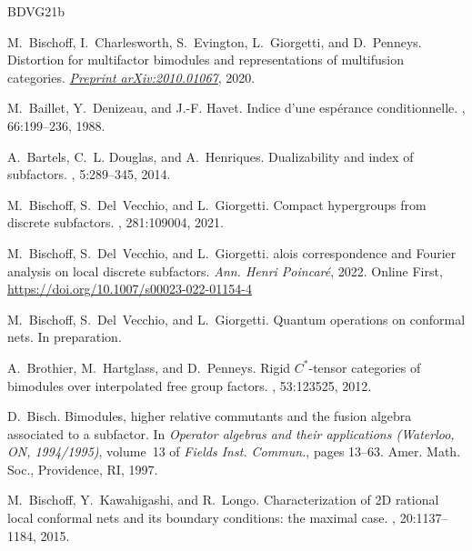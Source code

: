 \documentclass[11pt,a4paper]{article}
\theoremstyle{plain}
\theoremstyle{definition}
\theoremstyle{remark}
\numberwithin{equation}{section}%
\begin{document}
\newcommand{\etalchar}[1]{$^{#1}$}
\def\cprime{$'$}
\begin{thebibliography}{BDVG21b}

\bibitem[BCE{\etalchar{+}}20]{BCEGP20}
M.~Bischoff, I.~Charlesworth, S.~Evington, L.~Giorgetti, and D.~Penneys.
\newblock Distortion for multifactor bimodules and representations of
  multifusion categories.
\newblock \href{https://arxiv.org/abs/2010.01067}{\em Preprint arXiv:2010.01067}, 2020.

M.~Baillet, Y.~Denizeau, and J.-F. Havet.
\newblock Indice d'une esp{\'e}rance conditionnelle.
, 66:199--236, 1988.

A.~Bartels, C.~L. Douglas, and A.~Henriques.
\newblock Dualizability and index of subfactors.
, 5:289--345, 2014.

M.~Bischoff, S.~Del~Vecchio, and L.~Giorgetti.
\newblock Compact hypergroups from discrete subfactors.
, 281:109004, 2021.

M.~Bischoff, S.~Del~Vecchio, and L.~Giorgetti.
alois correspondence and {F}ourier analysis on local discrete
  subfactors.
\newblock \emph{Ann. Henri Poincar\'e}, 2022. Online First,
\href{https://doi.org/10.1007/s00023-022-01154-4}{https://doi.org/10.1007/s00023-022-01154-4}

M.~Bischoff, S.~Del~Vecchio, and L.~Giorgetti.
\newblock Quantum operations on conformal nets.
\newblock In preparation.

A.~Brothier, M.~Hartglass, and D.~Penneys.
\newblock Rigid ${C}^*$-tensor categories of bimodules over interpolated free
  group factors.
, 53:123525, 2012.

D.~Bisch.
\newblock Bimodules, higher relative commutants and the fusion algebra
  associated to a subfactor.
\newblock In {\em Operator algebras and their applications ({W}aterloo, {ON},
  1994/1995)}, volume~13 of {\em Fields Inst. Commun.}, pages 13--63. Amer.
  Math. Soc., Providence, RI, 1997.

M.~Bischoff, Y.~Kawahigashi, and R.~Longo.
\newblock Characterization of 2{D} rational local conformal nets and its
  boundary conditions: the maximal case.
, 20:1137--1184, 2015.


\end{thebibliography}
\end{document}
